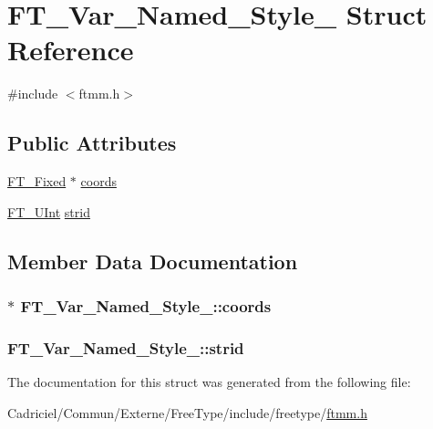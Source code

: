 \hypertarget{struct_f_t___var___named___style__}{\section{F\-T\-\_\-\-Var\-\_\-\-Named\-\_\-\-Style\-\_\- Struct Reference}
\label{struct_f_t___var___named___style__}
}


{\ttfamily \#include $<$ftmm.\-h$>$}

\subsection*{Public Attributes}
\begin{DoxyCompactItemize}
\item 
\hyperlink{fttypes_8h_a5f5a679cc09f758efdd0d1c5feed3c3d}{F\-T\-\_\-\-Fixed} $\ast$ \hyperlink{struct_f_t___var___named___style___a07195d55aee541db651ef3a8b04bb41f}{coords}
\item 
\hyperlink{fttypes_8h_abcb8db4dbf35d2b55a9e8c7b0926dc52}{F\-T\-\_\-\-U\-Int} \hyperlink{struct_f_t___var___named___style___a7802f6958c6e883bdce16b9931002826}{strid}
\end{DoxyCompactItemize}


\subsection{Member Data Documentation}
\hypertarget{struct_f_t___var___named___style___a07195d55aee541db651ef3a8b04bb41f}{
\subsubsection[{coords}]{$\ast$ F\-T\-\_\-\-Var\-\_\-\-Named\-\_\-\-Style\-\_\-\-::coords}}\label{struct_f_t___var___named___style___a07195d55aee541db651ef3a8b04bb41f}
\hypertarget{struct_f_t___var___named___style___a7802f6958c6e883bdce16b9931002826}{
\subsubsection[{strid}]{ F\-T\-\_\-\-Var\-\_\-\-Named\-\_\-\-Style\-\_\-\-::strid}}\label{struct_f_t___var___named___style___a7802f6958c6e883bdce16b9931002826}


The documentation for this struct was generated from the following file\-:\begin{DoxyCompactItemize}
\item 
Cadriciel/\-Commun/\-Externe/\-Free\-Type/include/freetype/\hyperlink{ftmm_8h}{ftmm.\-h}\end{DoxyCompactItemize}
